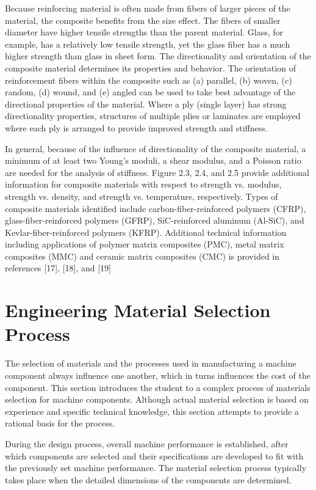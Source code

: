 \documentclass[a4paper,openany,12pt]{book}
\begin{document}
Because reinforcing material is often made from fibers of larger pieces
of the material, the composite benefits from the size effect. The fibers
of smaller diameter have higher tensile strengths than the parent
material. Glass, for example, has a relatively low tensile strength, yet
the glass fiber has a much higher strength than glass in sheet form. The
directionality and orientation of the composite material determines its
properties and behavior. The orientation of reinforcement fibers within
the composite such as (a) parallel, (b) woven, (c) random, (d) wound,
and (e) angled can be used to take best advantage of the directional
properties of the material. Where a ply (single layer) has strong
directionality properties, structures of multiple plies or laminates are
employed where each ply is arranged to provide improved strength and
stiffness.

In general, because of the influence of directionality of the composite
material, a minimum of at least two Young's moduli, a shear modulus, and
a Poisson ratio are needed for the analysis of stiffness. Figure 2.3,
2.4, and 2.5 provide additional information for composite materials with
respect to strength vs. modulus, strength vs. density, and strength vs.
temperature, respectively. Types of composite materials identified
include carbon-fiber-reinforced polymers (CFRP), glass-fiber-reinforced
polymers (GFRP), SiC-reinforced aluminum (Al-SiC), and
Kevlar-fiber-reinforced polymers (KFRP). Additional technical
information including applications of polymer matrix composites (PMC),
metal matrix composites (MMC) and ceramic matrix composites (CMC) is
provided in references [17], [18], and [19]

\section{Engineering Material Selection Process}
\label{sec:org48796bc}
The selection of materials and the processes used in manufacturing a
machine component always influence one another, which in turns
influences the cost of the component. This section introduces the
student to a complex process of materials selection for machine
components. Although actual material selection is based on experience
and specific technical knowledge, this section attempts to provide a
rational basis for the process.

During the design process, overall machine performance is established,
after which components are selected and their specifications are
developed to fit with the previously set machine performance. The
material selection process typically takes place when the detailed
dimensions of the components are determined.
\end{document}
